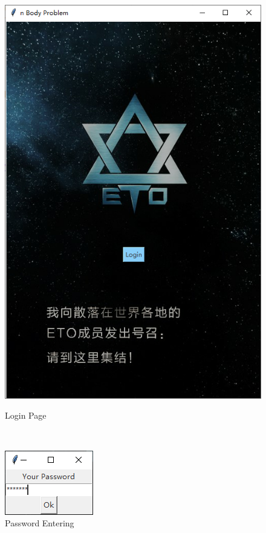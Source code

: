 \documentclass[]{report}
\begin{document}
\begin{figure}[h]
\begin{minipage}{40em}
\begin{minipage}{18em}
					\includegraphics[scale=0.5]{pics/LoginPage.PNG}
					\caption{Login Page}
				\end{minipage}
			\end{minipage}
			\\[5pt]
			\begin{minipage}{40em}
				\centering
				\begin{minipage}{18em}
					\centering
					\includegraphics{pics/Password.PNG}
					\caption{Password Entering}

\end{minipage}
\end{minipage}
\end{figure}
\end{document}
